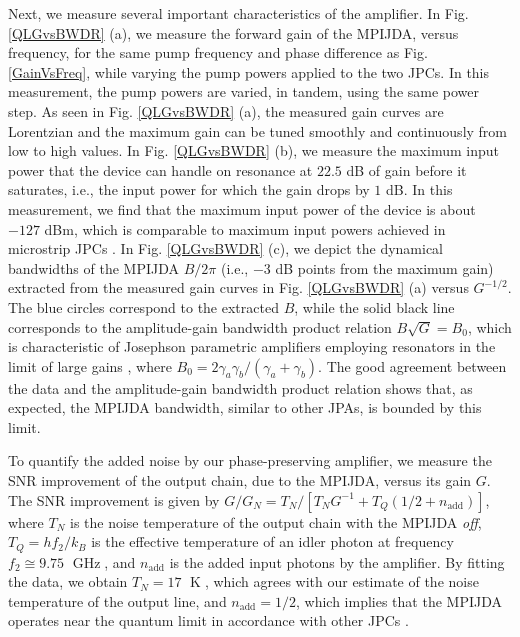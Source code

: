 \documentclass[aip,onecolumn,10pt]{revtex4}%
\begin{document}
Next, we measure several important characteristics of the amplifier. In Fig. \ref{QLGvsBWDR} (a), we measure the forward gain of the MPIJDA, versus frequency, for the same pump frequency and phase difference as Fig. \ref{GainVsFreq}, while varying the pump powers applied to the two JPCs. In this measurement, the pump powers are varied, in tandem, using the same power step. As seen in Fig. \ref{QLGvsBWDR} (a), the measured gain curves are Lorentzian and the maximum gain can be tuned smoothly and continuously from low to high values. In Fig. \ref{QLGvsBWDR} (b), we measure the maximum input power that the device can handle on resonance at $22.5$ dB of gain before it saturates, i.e., the input power for which the gain drops by $1$ dB. In this measurement, we find that the maximum input power of the device is about $-127$ dBm, which is comparable to maximum input powers achieved in microstrip JPCs \cite{JPCreview,Jamp}. In Fig. \ref{QLGvsBWDR} (c), we depict the dynamical bandwidths of the MPIJDA $B/2\pi$ (i.e., $-3$ dB points from the maximum gain) extracted from the measured gain curves in Fig. \ref{QLGvsBWDR} (a) versus $G^{-1/2}$. The blue circles correspond to the extracted $B$, while the solid black line corresponds to the amplitude-gain bandwidth product relation $B\sqrt{G}=B_{0}$, which is characteristic of Josephson parametric amplifiers employing resonators in the limit of large gains \cite{NoiseAmplReview,JPCreview}, where $B_{0}=2\gamma_{a}\gamma_{b}/(\gamma_{a}+\gamma_{b})$. The good agreement between the data and the amplitude-gain bandwidth product relation shows that, as expected, the MPIJDA bandwidth, similar to other JPAs, is bounded by this limit. 

To quantify the added noise by our phase-preserving amplifier, we measure the SNR improvement of the output chain, due to the MPIJDA, versus its gain $G$. The SNR improvement is given by $G/G_{N}=T_{N}/[T_{N}G^{-1}+T_{Q}(1/2+n_{\mathrm{add}})]$, where $T_{N}$ is the noise temperature of the output chain with the MPIJDA \textit{off}, $T_{Q}=hf_{2}/k_{B}$ is the effective temperature of an idler photon at frequency $f_{2}\cong9.75$ $\operatorname{GHz}$, and $n_{\mathrm{add}}$ is the added input photons by the amplifier. By fitting the data, we obtain $T_{N}=17$ $\operatorname{K}$, which agrees with our estimate of the noise temperature of the output line, and $n_{\mathrm{add}}=1/2$, which implies that the MPIJDA operates near the quantum limit in accordance with other JPCs \cite{JPCnature,JPCreview}.  
\end{document}
